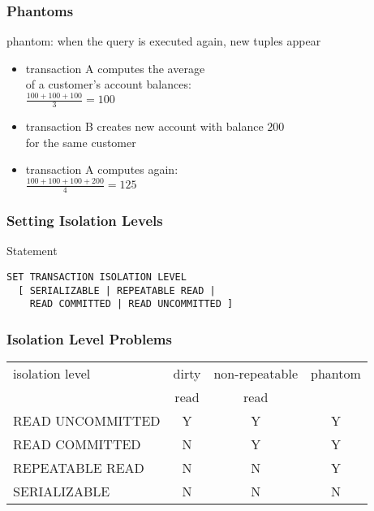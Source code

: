 \documentclass[dvipsnames]{beamer}
\theoremstyle{plain}
\begin{document}
\begin{frame}
  \frametitle{Phantoms}

  \begin{definition}
    \alert{phantom}: when the query is executed again, new tuples appear
  \end{definition}

  \pause
  \begin{example}
    \begin{itemize}
      \item transaction A computes the average\\
	of a customer's account balances:\\
        $\frac{100+100+100}{3}=100$

      \pause
      \item transaction B creates new account with balance $200$\\
	for the same customer
      \item transaction A computes again:\\
        $\frac{100+100+100+200}{4}=125$
    \end{itemize}
  \end{example}
\end{frame}

\begin{frame}[fragile]
  \frametitle{Setting Isolation Levels}

  \begin{block}{Statement}
    \begin{lstlisting}
SET TRANSACTION ISOLATION LEVEL
  [ SERIALIZABLE | REPEATABLE READ |
    READ COMMITTED | READ UNCOMMITTED ]
    \end{lstlisting}
  \end{block}
\end{frame}

\begin{frame}[fragile]
  \frametitle{Isolation Level Problems}

  \begin{table}
    \begin{tabular}{|l||c|c|c|}\hline
isolation level  & dirty & non-repeatable & phantom\\
                 & read  & read           &        \\\hline\hline
READ UNCOMMITTED & Y     & Y              & Y      \\\hline
READ COMMITTED   & N     & Y              & Y      \\\hline
REPEATABLE READ  & N     & N              & Y      \\\hline
SERIALIZABLE     & N     & N              & N      \\\hline
    \end{tabular}
  \end{table}
\end{frame}
\end{document}
